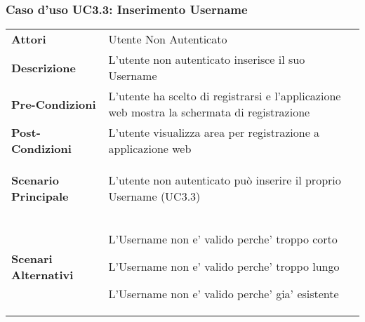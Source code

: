 \subsubsection{Caso d'uso UC3.3:  Inserimento Username}
\label{UC3_3}

\begin{longtable}{ l | p{11cm}}
	\hline
	\rowcolor{Gray}
	 \multicolumn{2}{c}{UC3.3:  Inserimento Username} \\
	 \hline
	\textbf{Attori} & Utente Non Autenticato \\
	\textbf{Descrizione} & L'utente non autenticato inserisce il suo Username  \\
	\textbf{Pre-Condizioni} & L'utente ha scelto di registrarsi e l'applicazione web mostra la schermata di registrazione \\
	\textbf{Post-Condizioni} & L'utente visualizza area per registrazione a applicazione web \\
	\textbf{Scenario Principale} & \begin{enumerate*}[label=(\arabic*.),itemjoin={\newline}]
		\item L'utente non autenticato può inserire il proprio Username (UC3.3)
	\end{enumerate*}\\
	\textbf{Scenari Alternativi} & 
	\begin{enumerate*}[label=(\arabic*.),itemjoin={\newline}]
		\item L'Username non e' valido perche' troppo corto 
		\item L'Username non e' valido perche' troppo lungo
		\item L'Username non e' valido perche' gia' esistente
	\end{enumerate*}\\
\end{longtable}